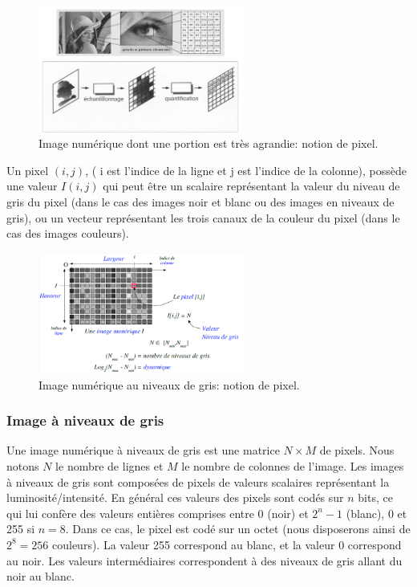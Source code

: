\begin{figure}[H]
	\centering
	\includegraphics[width=0.6\textwidth]{Figures/imgnum} 
	\caption{Image numérique dont une portion est très agrandie: notion de pixel.}
\end{figure}


Un pixel $(i, j)$, ( i est l’indice de la ligne et j est l’indice de la colonne), possède une valeur $I(i, j)$ qui peut être un scalaire représentant la valeur du niveau de gris du pixel (dans le cas des images noir et blanc ou des images en niveaux de gris), ou un vecteur représentant les trois canaux de la couleur du pixel (dans le cas des images couleurs).

\begin{figure}[H]
	\centering
	\includegraphics[width=0.6\textwidth]{Figures/pixel} 
	\caption{Image numérique au niveaux de gris: notion de pixel.}
\end{figure}




\subsubsection{Image à niveaux de gris}

Une image numérique à niveaux de gris est une matrice $N \times M$ de pixels. Nous notons $N$ le nombre de lignes et $M$ le nombre de colonnes de l'image. Les images à niveaux de gris sont composées de pixels de valeurs scalaires représentant la luminosité/intensité. En général ces valeurs des pixels sont  codés sur $n$ bits, ce qui lui confère des valeurs entières comprises entre 0 (noir) et $2^n-1$ (blanc), 0 et 255 si $n = 8$. Dans ce cas, le pixel est codé sur un octet (nous disposerons ainsi de $2^8=256$ couleurs). La valeur 255 correspond au blanc, et la valeur 0 correspond au noir. Les valeurs intermédiaires correspondent à des niveaux de gris allant du noir au blanc.\\

